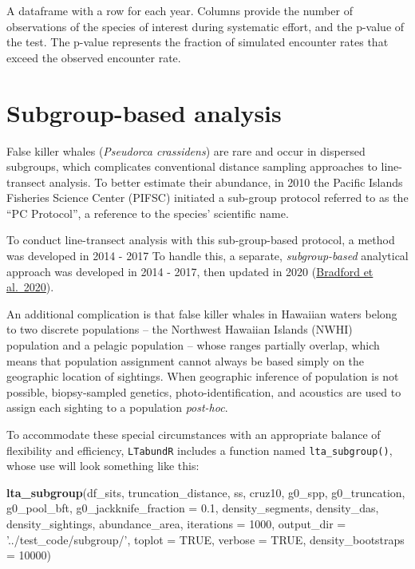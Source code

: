 \documentclass[
]{book}
\newenvironment{Shaded}{\begin{snugshade}}{\end{snugshade}}
\newcommand{\DataTypeTok}[1]{\textcolor[rgb]{0.13,0.29,0.53}{#1}}
\newcommand{\DecValTok}[1]{\textcolor[rgb]{0.00,0.00,0.81}{#1}}
\newcommand{\FloatTok}[1]{\textcolor[rgb]{0.00,0.00,0.81}{#1}}
\newcommand{\KeywordTok}[1]{\textcolor[rgb]{0.13,0.29,0.53}{\textbf{#1}}}
\newcommand{\NormalTok}[1]{#1}
\newcommand{\OtherTok}[1]{\textcolor[rgb]{0.56,0.35,0.01}{#1}}
\newcommand{\StringTok}[1]{\textcolor[rgb]{0.31,0.60,0.02}{#1}}
\begin{document}
A dataframe with a row for each year. Columns provide the number of observations of the species of interest during systematic effort, and the p-value of the test. The p-value represents the fraction of simulated encounter rates that exceed the observed encounter rate.

\hypertarget{subgroup-based-analysis}{%
\chapter{Subgroup-based analysis}\label{subgroup-based-analysis}}

False killer whales (\emph{Pseudorca crassidens}) are rare and occur in dispersed subgroups, which complicates conventional distance sampling approaches to line-transect analysis. To better estimate their abundance, in 2010 the Pacific Islands Fisheries Science Center (PIFSC) initiated a sub-group protocol referred to as the ``PC Protocol'', a reference to the species' scientific name.

To conduct line-transect analysis with this sub-group-based protocol, a method was developed in 2014 - 2017
To handle this, a separate, \emph{subgroup-based} analytical approach was developed in 2014 - 2017, then updated in 2020 (\href{https://www.fisheries.noaa.gov/inport/item/59592}{Bradford et al.~2020}).

An additional complication is that false killer whales in Hawaiian waters belong to two discrete populations -- the Northwest Hawaiian Islands (NWHI) population and a pelagic population -- whose ranges partially overlap, which means that population assignment cannot always be based simply on the geographic location of sightings. When geographic inference of population is not possible, biopsy-sampled genetics, photo-identification, and acoustics are used to assign each sighting to a population \emph{post-hoc}.

To accommodate these special circumstances with an appropriate balance of flexibility and efficiency, \texttt{LTabundR} includes a function named \texttt{lta\_subgroup()}, whose use will look something like this:

\begin{Shaded}
\begin{Highlighting}[]
\KeywordTok{lta_subgroup}\NormalTok{(df_sits,}
\NormalTok{             truncation_distance,}
\NormalTok{             ss,}
\NormalTok{             cruz10,}
\NormalTok{             g0_spp,}
\NormalTok{             g0_truncation,}
\NormalTok{             g0_pool_bft,}
             \DataTypeTok{g0_jackknife_fraction =} \FloatTok{0.1}\NormalTok{,}
\NormalTok{             density_segments,}
\NormalTok{             density_das,}
\NormalTok{             density_sightings,}
\NormalTok{             abundance_area,}
             \DataTypeTok{iterations =} \DecValTok{1000}\NormalTok{,}
             \DataTypeTok{output_dir =} \StringTok{'../test_code/subgroup/'}\NormalTok{,}
             \DataTypeTok{toplot =} \OtherTok{TRUE}\NormalTok{,}
             \DataTypeTok{verbose =} \OtherTok{TRUE}\NormalTok{,}
             \DataTypeTok{density_bootstraps =} \DecValTok{10000}\NormalTok{)}
\end{Highlighting}
\end{Shaded}
\end{document}
